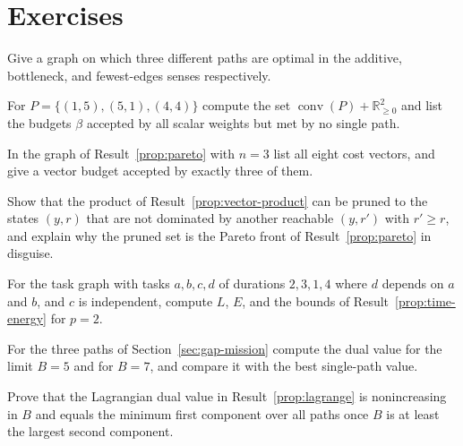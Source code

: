 \section*{Exercises}

\begin{exercise}
Give a graph on which three different paths are optimal in the additive, bottleneck, and fewest-edges senses respectively.
\end{exercise}

\begin{exercise}
For $P=\{(1,5),(5,1),(4,4)\}$ compute the set $\operatorname{conv}(P)+\mathbb R^2_{\ge0}$ and list the budgets $\beta$ accepted by all scalar weights but met by no single path.
\end{exercise}

\begin{exercise}
In the graph of Result~\ref{prop:pareto} with $n=3$ list all eight cost vectors, and give a vector budget accepted by exactly three of them.
\end{exercise}

\begin{exercise}
Show that the product of Result~\ref{prop:vector-product} can be pruned to the states $(y,r)$ that are not dominated by another reachable $(y,r')$ with $r'\ge r$, and explain why the pruned set is the Pareto front of Result~\ref{prop:pareto} in disguise.
\end{exercise}

\begin{exercise}
For the task graph with tasks $a,b,c,d$ of durations $2,3,1,4$ where $d$ depends on $a$ and $b$, and $c$ is independent, compute $L$, $E$, and the bounds of Result~\ref{prop:time-energy} for $p=2$.\label{ex2:abcd}
\end{exercise}

\begin{exercise}
For the three paths of Section~\ref{sec:gap-mission} compute the dual value for the limit $B=5$ and for $B=7$, and compare it with the best single-path value.
\end{exercise}

\begin{exercise}
Prove that the Lagrangian dual value in Result~\ref{prop:lagrange} is nonincreasing in $B$ and equals the minimum first component over all paths once $B$ is at least the largest second component.
\end{exercise}

